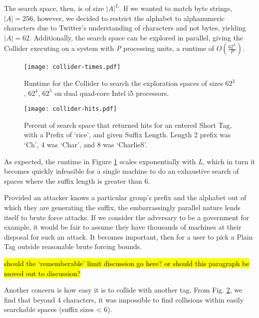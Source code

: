 The search space, then, is of size $|A|^L$. If we wanted to match byte strings, $|A| = 256$, however, we decided to restrict the alphabet to alphanumeric characters due to Twitter's understanding of characters and not bytes, yielding $|A| = 62$. Additionally, the search space can be explored in parallel, giving the Collider executing on a system with \textit{P} processing units, a runtime of $O(\frac{62^L}{P})$.


\begin{figure}
\begin{center}
\texttt{[image: collider-times.pdf]}
\caption{Runtime for the Collider to search the exploration spaces of sizes $62^3$, $62^4$, $62^5$ on dual quad-core Intel i5 processors.
\label{fig:collider-times}
}
\end{center}
\end{figure}

\begin{figure}
\begin{center}
\texttt{[image: collider-hits.pdf]}
\caption{Percent of search space that returned hits for an entered Short Tag, with a Prefix of `rice', and given Suffix Length. Length 2 prefix was `Ch', 4 was `Char', and 8 was `CharlieS'.
\label{fig:collider-hits}
}
\end{center}
\end{figure}

As expected, the runtime in Figure \ref{fig:collider-times} scales exponentially with \textit{L}, which in turn it becomes quickly infeasible for a single machine to do an exhaustive search of spaces where the suffix length is greater than 6.

Provided an attacker knows a particular group's prefix and the alphabet out of which they are generating the suffix, the embarrassingly parallel nature lends itself to brute force attacks. If we consider the adversary to be a government for example, it would be fair to assume they have thousands of machines at their disposal for such an attack. It becomes important, then for a user to pick a Plain Tag outside reasonable brute forcing bounds. 

\hl{should the `rememberable' limit discussion go here? or should this paragraph be moved out to discussion?}

Another concern is how easy it is to collide with another tag. From Fig. \ref{fig:collider-hits}, we find that beyond 4 characters, it was impossible to find collisions within easily searchable spaces (suffix sizes < 6). 

